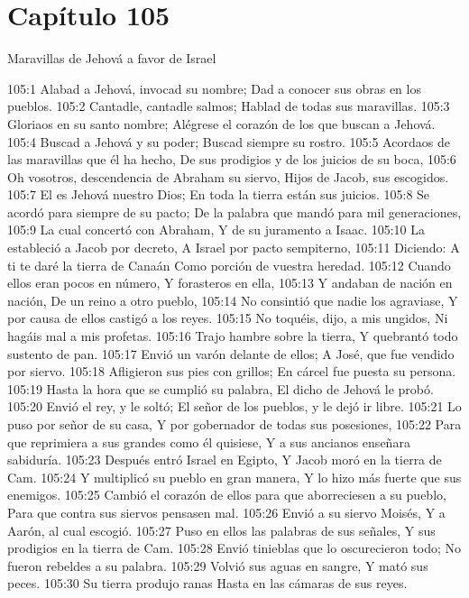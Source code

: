 \section*{Capítulo 105}
Maravillas de Jehová a favor de Israel 

 
105:1 Alabad a Jehová, invocad su nombre; 
Dad a conocer sus obras en los pueblos. 
105:2 Cantadle, cantadle salmos; 
Hablad de todas sus maravillas. 
105:3 Gloriaos en su santo nombre; 
Alégrese el corazón de los que buscan a Jehová. 
105:4 Buscad a Jehová y su poder; 
Buscad siempre su rostro. 
105:5 Acordaos de las maravillas que él ha hecho, 
De sus prodigios y de los juicios de su boca, 
105:6 Oh vosotros, descendencia de Abraham su siervo, 
Hijos de Jacob, sus escogidos. 
105:7 El es Jehová nuestro Dios; 
En toda la tierra están sus juicios. 
105:8 Se acordó para siempre de su pacto; 
De la palabra que mandó para mil generaciones, 
105:9 La cual concertó con Abraham, 
Y de su juramento a Isaac. 
105:10 La estableció a Jacob por decreto, 
A Israel por pacto sempiterno, 
105:11 Diciendo: A ti te daré la tierra de Canaán 
Como porción de vuestra heredad. 
105:12 Cuando ellos eran pocos en número, 
Y forasteros en ella, 
105:13 Y andaban de nación en nación, 
De un reino a otro pueblo, 
105:14 No consintió que nadie los agraviase, 
Y por causa de ellos castigó a los reyes. 
105:15 No toquéis, dijo, a mis ungidos, 
Ni hagáis mal a mis profetas. 
105:16 Trajo hambre sobre la tierra, 
Y quebrantó todo sustento de pan. 
105:17 Envió un varón delante de ellos; 
A José, que fue vendido por siervo. 
105:18 Afligieron sus pies con grillos; 
En cárcel fue puesta su persona. 
105:19 Hasta la hora que se cumplió su palabra, 
El dicho de Jehová le probó. 
105:20 Envió el rey, y le soltó; 
El señor de los pueblos, y le dejó ir libre. 
105:21 Lo puso por señor de su casa, 
Y por gobernador de todas sus posesiones, 
105:22 Para que reprimiera a sus grandes como él quisiese, 
Y a sus ancianos enseñara sabiduría. 
105:23 Después entró Israel en Egipto, 
Y Jacob moró en la tierra de Cam. 
105:24 Y multiplicó su pueblo en gran manera, 
Y lo hizo más fuerte que sus enemigos. 
105:25 Cambió el corazón de ellos para que aborreciesen a su pueblo, 
Para que contra sus siervos pensasen mal. 
105:26 Envió a su siervo Moisés, 
Y a Aarón, al cual escogió. 
105:27 Puso en ellos las palabras de sus señales, 
Y sus prodigios en la tierra de Cam. 
105:28 Envió tinieblas que lo oscurecieron todo; 
No fueron rebeldes a su palabra. 
105:29 Volvió sus aguas en sangre, 
Y mató sus peces. 
105:30 Su tierra produjo ranas 
Hasta en las cámaras de sus reyes. 
